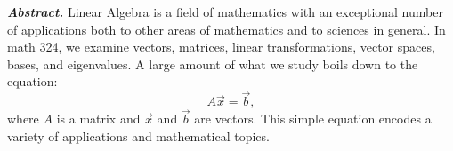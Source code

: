 \documentclass{article}
\begin{document}
\textbf{\textit{Abstract.}} Linear Algebra is a field of mathematics with an exceptional number of applications both to other areas of mathematics and to sciences in general.  In math 324, we examine vectors, matrices, linear transformations, vector spaces, bases, and eigenvalues.  A large amount of what we study boils down to the equation:
\begin{equation*}
A\vec x=\vec b,
\end{equation*}
 where $A$ is a matrix and $\vec x$ and $\vec b$ are vectors. This simple equation encodes a variety of applications and mathematical topics.
\end{document}
